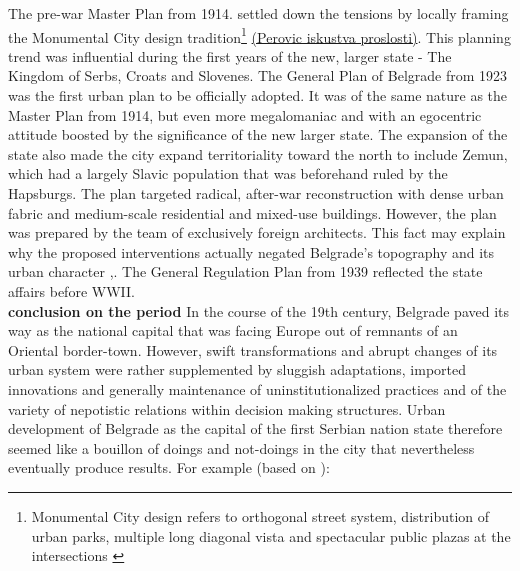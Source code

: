 \documentclass[11pt]{report}
\begin{document}
The pre-war Master Plan from 1914. settled down the tensions by locally framing the Monumental City design tradition\footnote{Monumental City design refers to orthogonal street system, distribution of urban parks, multiple long diagonal vista and spectacular public plazas at the intersections \href{}{\citealt{hirt_belgrade_2009}}} \href{}{(Perovic iskustva proslosti)}.
This planning trend was influential during the first years of the new, larger state - The Kingdom of Serbs, Croats and Slovenes.
The  General  Plan  of  Belgrade  from  1923 was the first urban plan to be officially adopted.
It was of the same nature as the Master Plan from 1914, but even more megalomaniac and with an egocentric attitude boosted by the significance of the new larger state.
The expansion of the state also made the city expand territoriality toward the north to include Zemun, which had a largely Slavic population that was beforehand ruled by the Hapsburgs.
The plan targeted radical, after-war reconstruction with dense urban fabric and medium-scale residential and mixed-use buildings.
However, the plan was prepared by the team of exclusively foreign architects. This fact may explain why the proposed interventions actually negated Belgrade’s  topography  and  its  urban  character \href{}{\citealt{grozdanic_belgrade_2008}},\href{}{\citealt{blagojevic_urban_2009}}.
The General Regulation Plan from 1939 reflected the state  affairs before WWII.
\\

\textbf{conclusion on the period}
In the course of the 19th century, Belgrade paved its way as the national capital that was facing Europe out of remnants of an Oriental border-town.
However, swift transformations and abrupt changes of its urban system were rather supplemented by sluggish adaptations, imported innovations and generally maintenance of uninstitutionalized practices and of the variety of nepotistic relations within decision making structures.
Urban development of Belgrade as the capital of the first Serbian nation state therefore seemed like a bouillon of doings and not-doings in the city that nevertheless eventually produce results. For example (based on \href{}{\citealt{dubravka_stojanovic_kontroverze_2015}}):
\end{document}
